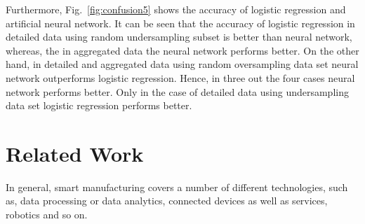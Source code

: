 \documentclass[runningheads]{llncs}
\begin{document}
Furthermore, Fig.~\ref{fig:confusion5} shows the accuracy of logistic regression and artificial neural network. It can be seen that the accuracy of logistic regression in detailed data using random undersampling subset is better than neural network, whereas, the in aggregated data the neural network performs better. On the other hand, in detailed and aggregated data using random oversampling data set neural network outperforms logistic regression. Hence, in three out the four cases neural network performs better. Only in the case of detailed data using undersampling data set logistic regression performs better. 








\section{Related Work}
\label{sec:relatedwork}
In general, smart manufacturing covers a number of different technologies, such as, data processing or data analytics, connected devices as well as services, robotics and so on. 
\end{document}
